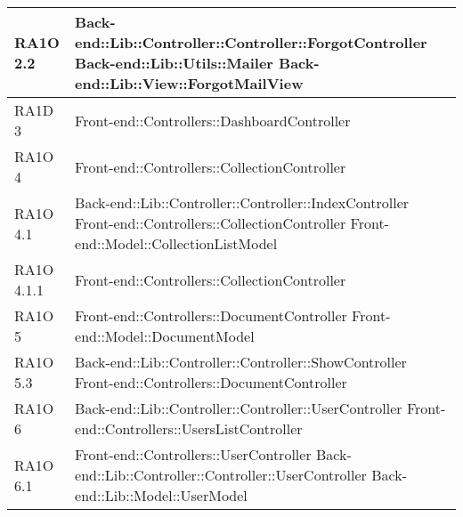 \begin{center}
\begin{longtable}{ | p{4cm} | p{10cm} | }
    RA1O 2.2 & Back-end::Lib::Controller::Controller::ForgotController \newline
    			  			Back-end::Lib::Utils::Mailer \newline
    			  			Back-end::Lib::View::ForgotMailView \newline  \\ \hline     
    			   
     
    RA1D 3 & Front-end::Controllers::DashboardController \newline  \\ \hline  
        
    RA1O 4 & Front-end::Controllers::CollectionController \newline  \\ \hline   
       
    RA1O 4.1 & Back-end::Lib::Controller::Controller::IndexController \newline Front-end::Controllers::CollectionController \newline Front-end::Model::CollectionListModel \newline  \\ \hline   
       
    RA1O 4.1.1 & Front-end::Controllers::CollectionController \newline  \\ \hline 
         
    RA1O 5 & Front-end::Controllers::DocumentController \newline
    			 Front-end::Model::DocumentModel \newline  \\ \hline    
           
    RA1O 5.3 & Back-end::Lib::Controller::Controller::ShowController \newline
    			 Front-end::Controllers::DocumentController\newline  \\ \hline      
    
    RA1O 6 & Back-end::Lib::Controller::Controller::UserController \newline Front-end::Controllers::UsersListController  \\ \hline  
        
    RA1O 6.1 & Front-end::Controllers::UserController \newline Back-end::Lib::Controller::Controller::UserController \newline Back-end::Lib::Model::UserModel \\ \hline   
       

\end{longtable}
\end{center}
